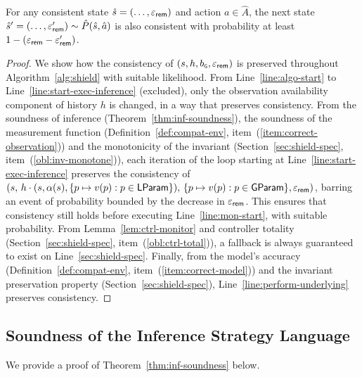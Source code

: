 \documentclass[acmsmall,screen,nonacm]{acmart}
\begin{document}
\begin{lemma}
 For any consistent state $\hat s=(\dots,\varepsilon_{\mathsf{rem}})$ and action $a \in \hat A$, the next state $\hat s' = (\dots,\varepsilon_{\mathsf{rem}}') \sim \hat P(\hat s, \hat a)$ is also consistent with probability at least $1 - (\varepsilon_{\mathsf{rem}} - \varepsilon_{\mathsf{rem}}')$.
\end{lemma}
\begin{proof}
We show how the consistency of $(s, h, b_\textsf{\tiny G}, \varepsilon_{\mathsf{rem}})$ is preserved throughout Algorithm~\ref{alg:shield} with suitable likelihood. From Line~\ref{line:algo-start} to Line~\ref{line:start-exec-inference} (excluded), only the observation availability component of history $h$ is changed, in a way that preserves consistency. From the soundness of inference (Theorem~\ref{thm:inf-soundness}), the soundness of the measurement function (Definition~\ref{def:compat-env}, item~(\ref{item:correct-observation})) and the monotonicity of the invariant (Section~\ref{sec:shield-spec}, item~(\ref{obl:inv-monotone})), each iteration of the loop starting at Line~\ref{line:start-exec-inference} preserves the consistency of $(s, \, h \cdot (s, \alpha(s), \{p \mapsto v(p) : p \in \mathsf{LParam}\}), \, \{p \mapsto v(p) : p \in \mathsf{GParam}\}, \varepsilon_{\mathsf{rem}})$, barring an event of probability bounded by the decrease in $\varepsilon_{\mathsf{rem}}$. This ensures that consistency still holds before executing Line~\ref{line:mon-start}, with suitable probability. From Lemma~\ref{lem:ctrl-monitor} and controller totality (Section~\ref{sec:shield-spec}, item~(\ref{obl:ctrl-total})), a fallback is always guaranteed to exist on Line~\ref{sec:shield-spec}. Finally, from the model's accuracy (Definition~\ref{def:compat-env}, item~(\ref{item:correct-model})) and the invariant preservation property (Section~\ref{sec:shield-spec}), Line~\ref{line:perform-underlying} preserves consistency.
\end{proof}

\subsection{Soundness of the Inference Strategy Language}\label{ap:inf-lang-soundness-proof}

We provide a proof of Theorem~\ref{thm:inf-soundness} below.

\newcommand{\latestEnv}{w}
\newcommand{\historyEnv}{h}
\end{document}
